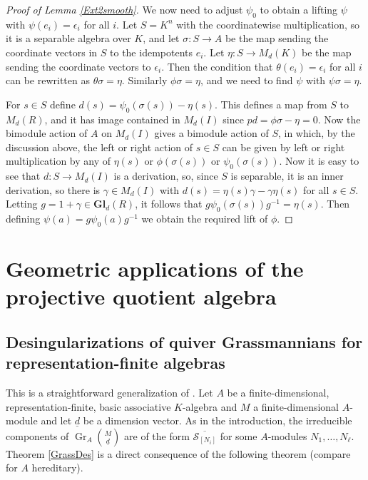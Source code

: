 \documentclass[11pt,a4paper]{amsart}
\theoremstyle{plain}
\theoremstyle{definition}
\begin{document}
\begin{proof}[Proof of Lemma \ref{Ext2smooth}]
We now need to adjust $\psi_0$ to obtain a lifting $\psi$ with $\psi(e_i) = \epsilon_i$ for all $i$.
Let $S = K^n$ with the coordinatewise multiplication, so it is a separable algebra over $K$, 
and let $\sigma:S\to A$ be the map sending the coordinate vectors in $S$ to the idempotents $e_i$.
Let $\eta:S\to M_d(K)$ be the map sending the coordinate vectors to $\epsilon_i$.
Then the condition that $\theta(e_i)=\epsilon_i$ for all $i$ can be rewritten as
$\theta \sigma = \eta$. Similarly $\phi\sigma = \eta$, and we need to find $\psi$ with $\psi\sigma = \eta$.

For $s\in S$ define $d(s) = \psi_0(\sigma(s)) - \eta(s)$. This defines a map from $S$ to $M_d(R)$,
and it has image contained in $M_d(I)$ since $pd = \phi\sigma - \eta = 0$.
Now the bimodule action of $A$ on $M_d(I)$ gives a bimodule action of $S$,
in which, by the discussion above, the left or right action of $s\in S$ can be given
by left or right multiplication by any of $\eta(s)$ or $\phi(\sigma(s))$ or $\psi_0(\sigma(s))$.
Now it is easy to see that $d:S\to M_d(I)$ is a derivation, so, since $S$ is separable,
it is an inner derivation, so there is $\gamma \in M_d(I)$ with 
$d(s) = \eta(s)\gamma - \gamma \eta(s)$ for all $s\in S$.
Letting $g = 1+ \gamma\in {\mathbf{Gl}}_d(R)$, it follows that
$g \psi_0(\sigma(s)) g^{-1} = \eta(s)$.
Then defining $\psi(a) = g\psi_0(a) g^{-1}$ we obtain the required lift of $\phi$.
\end{proof}

\section{Geometric applications of the projective quotient algebra}

\subsection*{Desingularizations of quiver Grassmannians for representation-finite algebras}
This is a straightforward generalization of \cite[\S 7]{CIFR}. 
Let $A$ be a finite-dimensional, representation-finite, basic associative $K$-algebra and $M$ a finite-dimensional $A$-module and let ${\underline{d}}$ be a dimension vector. 
As in the introduction, the irreducible components of ${\operatorname{Gr}_A \binom{M}{\underline{d}}}$ are of the form 
$\overline{{\mathcal{S}}_{[N_i]}}$ for some $A$-modules $N_1,\dots,N_\ell$.
Theorem \ref{GrassDes} is a direct consequence of the following theorem (compare \cite[Theorem 7.5]{CIFR} for $A$ hereditary).  
 
\end{document}
